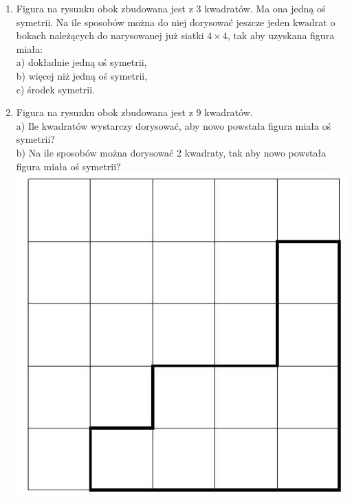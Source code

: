 \documentclass[10pt]{article}
\begin{document}
\begin{enumerate}
  \item Figura na rysunku obok zbudowana jest z 3 kwadratów. Ma ona jedną oś symetrii. Na ile sposobów można do niej dorysować jeszcze jeden kwadrat o bokach należących do narysowanej już siatki \(4 \times 4\), tak aby uzyskana figura miała:\\
a) dokładnie jedną oś symetrii,\\
b) więcej niż jedną oś symetrii,\\
c) środek symetrii.
  \item Figura na rysunku obok zbudowana jest z 9 kwadratów.\\
a) Ile kwadratów wystarczy dorysować, aby nowo powstała figura miała oś symetrii?\\
b) Na ile sposobów można dorysować 2 kwadraty, tak aby nowo powstała figura miała oś symetrii?\\
\includegraphics[max width=\textwidth, center]{2024_11_21_71f62bd117d375398909g-204(1)}\\

\end{enumerate}
\end{document}
